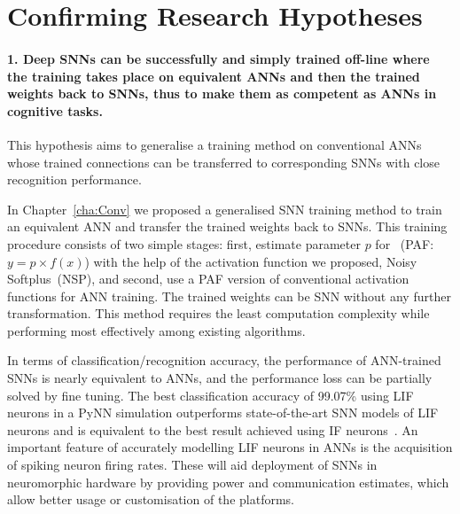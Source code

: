 \section{Confirming Research Hypotheses}
\paragraph{1. Deep SNNs can be successfully and simply trained off-line where the training takes place on equivalent ANNs and then \DIFdelbegin {}\DIFdelend the trained weights \DIFaddbegin {}\DIFaddend back to \DIFaddbegin {}\DIFaddend SNNs, thus to make them as competent as \DIFaddbegin {}\DIFaddend ANNs in cognitive tasks.}
This hypothesis aims to generalise a training method on conventional ANNs whose trained connections can be transferred to corresponding SNNs with close recognition performance.

In Chapter~\ref{cha:Conv} we proposed a generalised SNN training method to train an equivalent ANN and transfer the trained weights back to SNNs.
This training procedure consists of two simple stages: first, estimate parameter $p$ for \DIFdelbegin {}\DIFdelend \DIFaddbegin {}\DIFaddend ~(PAF: $y = p \times f(x)$) with the help of the activation function we proposed, Noisy Softplus~(NSP), and second, use a PAF version of \DIFaddbegin {}\DIFaddend conventional activation functions for ANN training. %
The trained weights can be \DIFdelbegin {}\DIFdelend \DIFaddbegin {}\DIFaddend SNN without any further transformation.
This method requires the least computation complexity while performing most effectively among existing algorithms.

In terms of classification/recognition accuracy, the performance of ANN-trained SNNs is nearly equivalent to ANNs, and the performance loss can be partially solved by fine tuning.
The best classification accuracy of 99.07\% using LIF neurons in a PyNN simulation outperforms state-of-the-art SNN models of LIF neurons and is equivalent to the best result achieved using IF neurons~\citep{diehl2015fast}.
An important feature of accurately modelling LIF neurons in ANNs is the acquisition of spiking neuron firing rates. These will aid deployment of SNNs in neuromorphic hardware by providing power and communication estimates, which \DIFdelbegin {}\DIFdelend allow better usage or customisation of the platforms.

